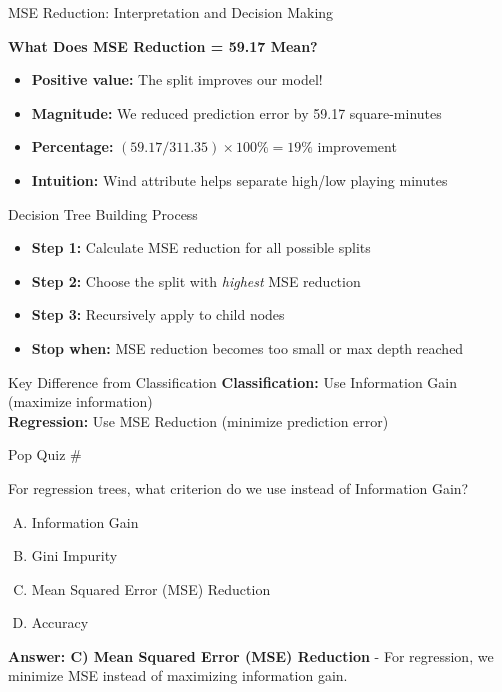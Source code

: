 \documentclass[usenames,dvipsnames]{beamer}
\begin{document}
\begin{frame}{MSE Reduction: Interpretation and Decision Making}
\begin{keypointsbox}
\textbf{What Does MSE Reduction = 59.17 Mean?}
\begin{itemize}
	\item \textbf{Positive value:} The split improves our model!
	\item \textbf{Magnitude:} We reduced prediction error by 59.17 square-minutes
	\item \textbf{Percentage:} $(59.17 / 311.35) \times 100\% = 19\%$ improvement
	\item \textbf{Intuition:} Wind attribute helps separate high/low playing minutes
\end{itemize}
\end{keypointsbox}

\pause
\begin{examplebox}{Decision Tree Building Process}
\begin{itemize}
	\item \textbf{Step 1:} Calculate MSE reduction for all possible splits
	\item \textbf{Step 2:} Choose the split with \emph{highest} MSE reduction
	\item \textbf{Step 3:} Recursively apply to child nodes
	\item \textbf{Stop when:} MSE reduction becomes too small or max depth reached
\end{itemize}
\end{examplebox}

\pause
\begin{alertbox}{Key Difference from Classification}
\textbf{Classification:} Use Information Gain (maximize information)\\
\textbf{Regression:} Use MSE Reduction (minimize prediction error)
\end{alertbox}
\end{frame}

\begin{frame}{Pop Quiz \#\thepopquiz}
\begin{tcolorbox}[colback=blue!5!white,colframe=blue!75!black,title=Quick Question!]
For regression trees, what criterion do we use instead of Information Gain?
\begin{enumerate}[A)]
\item Information Gain
\item Gini Impurity
\item Mean Squared Error (MSE) Reduction
\item Accuracy
\end{enumerate}
\pause
\textbf{Answer: C) Mean Squared Error (MSE) Reduction} - For regression, we minimize MSE instead of maximizing information gain.
\end{tcolorbox}
\end{frame}
\end{document}
